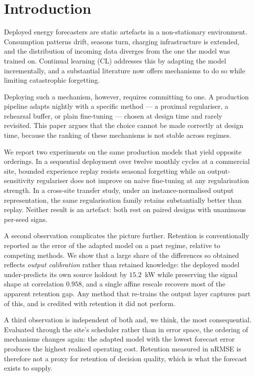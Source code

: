 \documentclass[journal]{IEEEtran}
\begin{document}
\section{Introduction}
\label{sec:intro}

Deployed energy forecasters are static artefacts in a non-stationary
environment. Consumption patterns drift, seasons turn, charging infrastructure
is extended, and the distribution of incoming data diverges from the one the
model was trained on. Continual learning (CL) addresses this by adapting the
model incrementally, and a substantial literature now offers mechanisms to do
so while limiting catastrophic forgetting.

Deploying such a mechanism, however, requires committing to one. A production
pipeline adapts nightly with a specific method --- a proximal regulariser, a
rehearsal buffer, or plain fine-tuning --- chosen at design time and rarely
revisited. This paper argues that the choice cannot be made correctly at design
time, because the ranking of these mechanisms is not stable across regimes.

We report two experiments on the same production models that yield opposite
orderings. In a sequential deployment over twelve monthly cycles at a commercial
site, bounded experience replay resists seasonal forgetting while an
output-sensitivity regulariser does not improve on naive fine-tuning at any
regularisation strength. In a cross-site transfer study, under an
instance-normalised output representation, the same regularisation family
retains substantially better than replay. Neither result is an artefact: both
rest on paired designs with unanimous per-seed signs.

A second observation complicates the picture further. Retention is conventionally
reported as the error of the adapted model on a past regime, relative to
competing methods. We show that a large share of the differences so obtained
reflects \emph{output calibration} rather than retained knowledge: the deployed
model under-predicts its own source holdout by $15.2$~kW while preserving the
signal shape at correlation $0.958$, and a single affine rescale recovers most
of the apparent retention gap. Any method that re-trains the output layer
captures part of this, and is credited with retention it did not perform.

A third observation is independent of both and, we think, the most consequential.
Evaluated through the site's scheduler rather than in error space, the ordering
of mechanisms changes again: the adapted model with the lowest forecast error
produces the highest realised operating cost. Retention measured in nRMSE is
therefore not a proxy for retention of decision quality, which is what the
forecast exists to supply.
\end{document}
